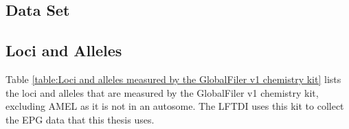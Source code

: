 
\begin{theappendices}


\chapter{Data Set}
\thispagestyle{myheadings}

\section{Loci and Alleles}
\label{section:Loci and Alleles}

Table \ref{table:Loci and alleles measured by the GlobalFiler v1 chemistry kit} lists the loci and alleles that are measured by the GlobalFiler v1 chemistry kit, excluding AMEL as it is not in an autosome. The LFTDI uses this kit to collect the EPG data that this thesis uses.


\end{theappendices}
